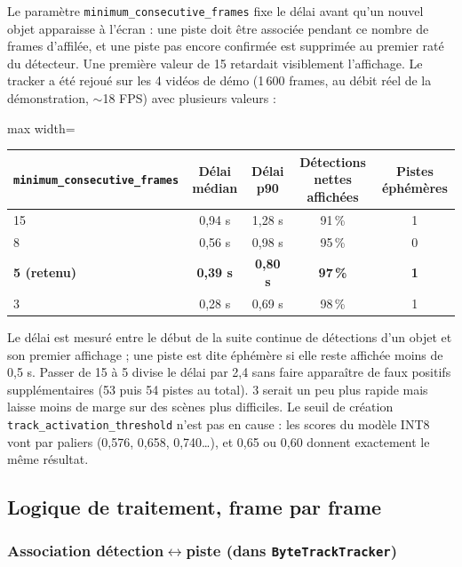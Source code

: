 \documentclass[11pt,a4paper]{article}
\let\Oldsubsection\subsection
\renewcommand{\subsection}{\FloatBarrier\Oldsubsection}
\let\Oldsubsubsection\subsubsection
\renewcommand{\subsubsection}{\FloatBarrier\Oldsubsubsection}
\begin{document}
    Le paramètre \texttt{minimum\_consecutive\_frames} fixe le délai avant
    qu'un nouvel objet apparaisse à l'écran : une piste doit être associée
    pendant ce nombre de frames d'affilée, et une piste pas encore confirmée est
    supprimée au premier raté du détecteur. Une première valeur de 15
    retardait visiblement l'affichage. Le tracker a été rejoué sur les 4
    vidéos de démo (1\,600 frames, au débit réel de la démonstration,
    $\sim$18 FPS) avec plusieurs valeurs :

    \begin{table}[!htbp]
    \centering
    \small
    \begin{adjustbox}{max width=\linewidth}
    \begin{tabular}{@{}lcccc@{}}
    \toprule
    \texttt{minimum\_consecutive\_frames} & \textbf{Délai médian} & \textbf{Délai p90} & \textbf{Détections nettes affichées} & \textbf{Pistes éphémères} \\
    \midrule
    15 & 0,94 s & 1,28 s & 91\,\% & 1 \\
    8 & 0,56 s & 0,98 s & 95\,\% & 0 \\
    \textbf{5 (retenu)} & \textbf{0,39 s} & \textbf{0,80 s} & \textbf{97\,\%} & \textbf{1} \\
    3 & 0,28 s & 0,69 s & 98\,\% & 1 \\
    \bottomrule
    \end{tabular}
    \end{adjustbox}
    \end{table}

    Le délai est mesuré entre le début de la suite continue de détections
    d'un objet et son premier affichage ; une piste est dite éphémère si
    elle reste affichée moins de 0,5 s. Passer de 15 à 5 divise le délai
    par 2,4 sans faire apparaître de faux positifs supplémentaires (53 puis
    54 pistes au total). 3 serait un peu plus rapide mais laisse moins de
    marge sur des scènes plus difficiles. Le seuil de création
    \texttt{track\_activation\_threshold} n'est pas en cause : les scores
    du modèle INT8 vont par paliers (0,576, 0,658, 0,740\ldots), et 0,65
    ou 0,60 donnent exactement le même résultat.

    \subsection{Logique de traitement, frame par frame}
    
    \subsubsection{Association détection$\leftrightarrow$piste (dans \texttt{ByteTrackTracker})}
    
\end{document}
